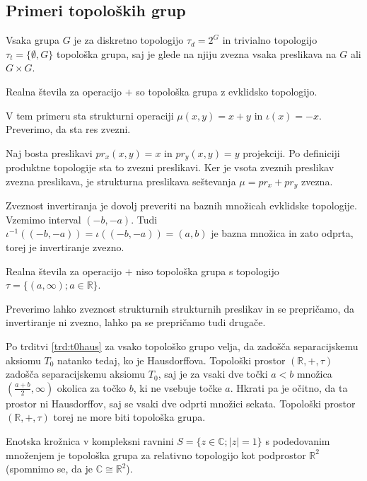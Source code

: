 \documentclass[mat1]{fmfdelo}
\newcommand{\R}{\mathbb R}
\newcommand{\C}{\mathbb C}
\begin{document}
\subsection{Primeri topoloških grup}

\begin{primer}
Vsaka grupa $G$ je za diskretno topologijo $\tau_d = 2^G$ in trivialno topologijo $\tau_t = \lbrace \emptyset, G \rbrace$ topološka grupa, saj je glede na njiju zvezna vsaka preslikava na $G$ ali $G \times G$.
\end{primer}

\begin{primer}
Realna števila za operacijo $+$ so topološka grupa z evklidsko topologijo.

V tem primeru sta strukturni operaciji $\mu(x, y) = x + y$ in $\iota(x) = -x$. Preverimo, da sta res zvezni.

Naj bosta preslikavi $pr_x(x, y) = x$ in $pr_y(x, y) = y$ projekciji. Po definiciji produktne topologije sta to zvezni preslikavi. Ker je vsota zveznih preslikav zvezna preslikava, je strukturna preslikava seštevanja $\mu = pr_x + pr_y$ zvezna.

Zveznost invertiranja je dovolj preveriti na baznih množicah evklidske topologije. Vzemimo interval $(-b, -a)$. Tudi $\iota^{-1}((-b, -a)) = \iota((-b, -a)) = (a, b)$ je bazna množica in zato odprta, torej je invertiranje zvezno.
\end{primer}

\begin{primer}
Realna števila za operacijo $+$ niso topološka grupa s topologijo $\tau = \lbrace (a, \infty) ; a \in \R \rbrace$.

Preverimo lahko zveznost strukturnih strukturnih preslikav in se prepričamo, da invertiranje ni zvezno, lahko pa se prepričamo tudi drugače.

Po trditvi \ref{trd:t0haus} za vsako topološko grupo velja, da zadošča separacijskemu aksiomu $T_0$ natanko tedaj, ko je Hausdorffova. Topološki prostor $(\R, +, \tau)$ zadošča separacijskemu aksiomu $T_0$, saj je za vsaki dve točki $a < b$ množica $(\frac{a+b}{2}, \infty)$ okolica za točko $b$, ki ne vsebuje točke $a$. Hkrati pa je očitno, da ta prostor ni Hausdorffov, saj se vsaki dve odprti množici sekata. Topološki prostor $(\R, +, \tau)$ torej ne more biti topološka grupa.
\end{primer}

\begin{primer}
Enotska krožnica v kompleksni ravnini $S = \lbrace z \in \C ; |z| = 1 \rbrace$ s podedovanim množenjem je topološka grupa za relativno topologijo kot podprostor $\R^2$ (spomnimo se, da je $\C \cong \R^2$).
\end{primer}
\end{document}
